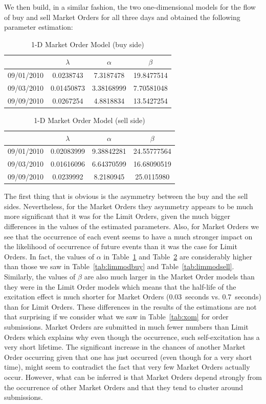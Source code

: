 We then build, in a similar fashion, the two one-dimensional models for the flow of buy and sell Market Orders for all three days and obtained the following parameter estimation: 
	\begin{table}[!htbp]
	\centering
	\caption{1-D Market Order Model (buy side) \label{tab:marketorderbuy}}
	\begin{tabular}{c|ccc} 
		& $\lambda$ & $\alpha$ & $\beta$ \\ \hline
	09/01/2010 & 0.0238743 & 7.3187478 & 19.8477514 \\
	09/03/2010 & 0.01450873 & 3.38168999 & 7.70581048 \\
	09/09/2010 & 0.0267254 & 4.8818834 & 13.5427254
	\end{tabular}
	\end{table}
	\begin{table}[!htbp]
	\centering
	\caption{1-D Market Order Model (sell side) \label{fig:marketordersell}}
	\begin{tabular}{c|ccc} 
		& $\lambda$ & $\alpha$  & $\beta$ \\ \hline
	09/01/2010 & 0.02083999 & 9.38842281 & 24.55777564 \\
	09/03/2010 & 0.01616096 & 6.64370599 & 16.68090519 \\
	09/09/2010 & 0.0239992 & 8.2180945 & 25.0115980
	\end{tabular}
	\end{table}
The first thing that is obvious is the asymmetry between the buy and the sell sides. Nevertheless, for the Market Orders they asymmetry appears to be much more significant that it was for the Limit Orders, given the much bigger differences in the values of the estimated parameters. Also, for Market Orders we see that the occurrence of each event seems to have a much stronger impact on the likelihood of occurrence of future events than it was the case for Limit Orders. In fact, the values of $\alpha$ in Table~\ref{tab:marketorderbuy} and Table~\ref{fig:marketordersell} are considerably higher than those we saw in Table~\ref{tab:limmodbuy} and Table~\ref{tab:limmodsell}. Similarly, the values of $\beta$ are also much larger in the Market Order models than they were in the Limit Order models which means that the half-life of the excitation effect is much shorter for Market Orders (0.03~seconds vs. 0.7~seconds) than for Limit Orders. These differences in the results of the estimations are not that surprising if we consider what we saw in Table~\ref{tab:xom} for order submissions. Market Orders are submitted in much fewer numbers than Limit Orders which explains why even though the occurrence, such self-excitation has a very short lifetime. The significant increase in the chances of another Market Order occurring given that one has just occurred (even though for a very short time), might seem to contradict the fact that very few Market Orders actually occur. However, what can be inferred is that Market Orders depend strongly from the occurrence of other Market Orders and that they tend to cluster around submissions. 



